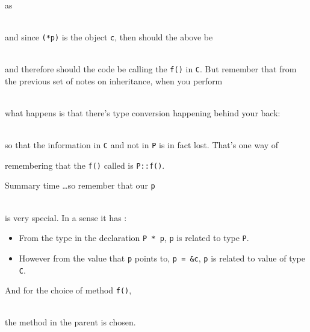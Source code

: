 \\

as

\\

and since \verb!(*p)! is the object \verb!c!, then should the above be

\\

and therefore should the code be calling the \verb!f()! in \verb!C!. But remember that from the previous set of notes on inheritance, when you perform

\\

what happens is that there's type conversion happening
behind your back:

\\

so that the information in \verb!C! and not in \verb!P! is in fact lost.
That's one way of

remembering that the \verb!f()! called is \verb!P::f()!.

Summary time \ldots so remember that our \verb!p!

\\

is very special. In a sense it has :

\begin{itemize}
\item
  From the type in the declaration \verb!P * p!, \verb!p! is related to type \verb!P!.
\item
  However from the value that \verb!p! points to, \verb!p = &c!, \verb!p! is related to value of type \verb!C!.
\end{itemize}

And for the choice of method \verb!f()!,

\\

the method in the parent is chosen.

